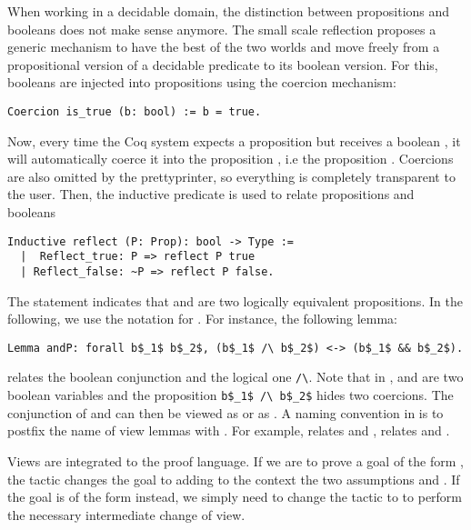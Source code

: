 When working in a decidable domain, the distinction between propositions
and booleans does not make sense anymore. The small scale reflection proposes 
a generic mechanism to have the best of the two worlds and move freely 
from a propositional version of a
decidable predicate to its boolean version.
For this, booleans are injected into propositions 
using the coercion mechanism:
\begin{lstlisting}
Coercion is_true (b: bool) := b = true.
\end{lstlisting}
Now, every time the {\sc Coq} system expects a proposition but receives a boolean , 
it will automatically coerce it into the proposition , i.e
the  proposition . Coercions are also omitted by the prettyprinter,
so everything is completely transparent to the user.
Then, the inductive predicate 
is used to relate propositions and booleans
\begin{lstlisting}
Inductive reflect (P: Prop): bool -> Type :=
  |  Reflect_true: P => reflect P true
  | Reflect_false: ~P => reflect P false.
\end{lstlisting}
The statement  indicates that 
and  are two logically equivalent propositions. In the following, we use
the notation  for .
For instance, the following lemma:
\begin{lstlisting}
Lemma andP: forall b$_1$ b$_2$, (b$_1$ /\ b$_2$) <-> (b$_1$ && b$_2$).
\end{lstlisting}
relates the boolean conjunction \C{\&\&} and
the logical one \lstinline[basicstyle=\footnotesize]+/\+. 
Note that in ,  and  are two boolean variables and
the proposition \lstinline[basicstyle=\footnotesize]+b$_1$ /\ b$_2$+ hides two coercions.
The conjunction of  and  can then be viewed
as   or as . 
A naming convention in \ssr{} is to postfix the name of view lemmas with .
For example,  relates  \C{\|\|} and \C{\\/},  relates   and \C{\~}.

Views are integrated to the proof language.
If we are to prove a goal of the form ,
the tactic  changes the goal to 
adding to the context the two assumptions
 and .
If the goal is of the form  instead, we simply need
to change the tactic to   to perform
the necessary intermediate change of view.

